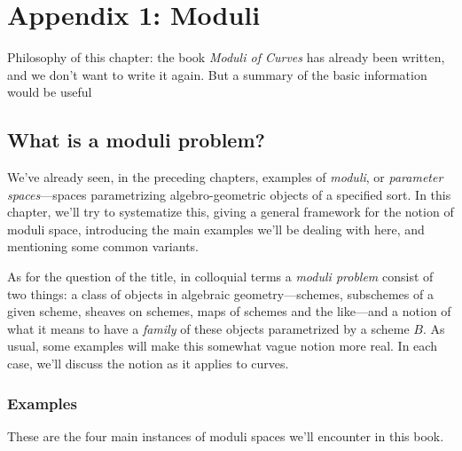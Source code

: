 

\chapter{Appendix 1: Moduli} 
\label{Moduli chapter}

Philosophy of this chapter: the book \emph{Moduli of Curves} has already been written, and we don't want to write it again. But a summary of the basic information would be useful

\section{What is a moduli problem?}

We've already seen, in the preceding chapters, examples of \emph{moduli}, or \emph{parameter spaces}---spaces parametrizing algebro-geometric objects of a specified sort. In this chapter, we'll try to systematize this, giving a general framework for the notion of moduli space, introducing the main examples we'll be dealing with here, and mentioning some common variants.

As for the question of the title, in colloquial terms a \emph{moduli problem} consist of two things: a class of objects in algebraic geometry---schemes, subschemes of a given scheme, sheaves on schemes, maps of schemes and the like---and a notion of what it means to have a \emph{family} of these objects parametrized by a scheme $B$. As usual, some examples will make this somewhat vague notion more real. In each case, we'll discuss the notion as it applies to curves.

\subsection{Examples}

These are the four main instances of moduli spaces we'll encounter in this book.

